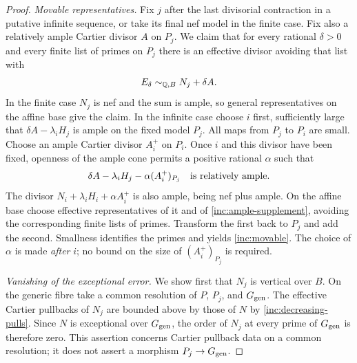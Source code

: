 \begin{proof}
\smallskip\noindent\emph{Movable representatives.}
Fix $j$ after the last divisorial contraction in a putative infinite
sequence, or take its final nef model in the finite case.  Fix also
a relatively ample Cartier divisor $A$ on $P_j$.  We claim that for
every rational $\delta>0$ and every finite list of primes on $P_j$
there is an effective divisor avoiding that list with
\begin{equation}\label{inc:movable}
 E_\delta\sim_{\mathbb Q,B}N_j+\delta A.
\end{equation}
In the finite case $N_j$ is nef and the sum is ample, so general
representatives on the affine base give the claim.  In the infinite
case choose $i$ first, sufficiently large that
$\delta A-\lambda_iH_j$ is ample on the fixed model $P_j$.
All maps from $P_j$ to $P_i$ are small.  Choose an ample Cartier
divisor $A_i^+$ on $P_i$.  Once $i$ and this divisor have been fixed,
openness of the ample cone permits a positive rational $\alpha$ such
that
\begin{equation}\label{inc:ample-supplement}
 \delta A-\lambda_iH_j-\alpha(A_i^+)_{P_j}
 \quad\hbox{is relatively ample.}
\end{equation}
The divisor $N_i+\lambda_iH_i+\alpha A_i^+$ is also ample, being nef
plus ample.  On the affine base choose effective representatives of
it and of \eqref{inc:ample-supplement}, avoiding the corresponding
finite lists of primes.  Transform the first back to $P_j$ and add
the second.  Smallness identifies the primes and yields
\eqref{inc:movable}.  The choice of $\alpha$ is made \emph{after} $i$;
no bound on the size of $(A_i^+)_{P_j}$ is required.

\smallskip\noindent\emph{Vanishing of the exceptional error.}
We show first that $N_j$ is vertical over $B$.  On the generic fibre
take a common resolution of $P$, $P_j$, and $G_{\rm gen}$.
The effective Cartier pullbacks of $N_j$ are bounded above by those
of $N$ by \eqref{inc:decreasing-pulls}.  Since $N$ is exceptional
over $G_{\rm gen}$, the order of $N_j$ at every prime of
$G_{\rm gen}$ is therefore zero.  This assertion concerns Cartier
pullback data on a common resolution; it does not assert a morphism
$P_j\to G_{\rm gen}$.


\end{proof}
